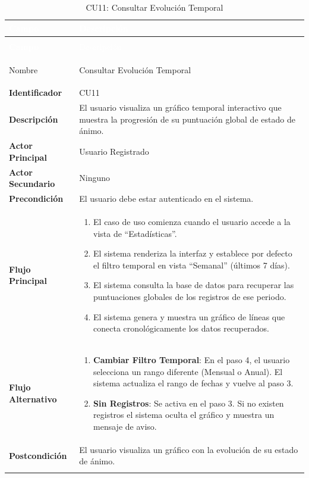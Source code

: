 \begingroup
\small 
\renewcommand{\arraystretch}{1.4}
\begin{xltabular}{\textwidth}{|>{\bfseries}p{3.5cm}|X|}
    \textcolor{white}{Campo} & \textcolor{white}{Descripción} \\ \hline
    \endfirsthead

     \\
    \hline
    \textcolor{white}{Campo} & \textcolor{white}{Descripción} \\ \hline
    \endhead

    Nombre & Consultar Evolución Temporal \\ \hline
    Identificador & CU11 \\ \hline
    Descripción & El usuario visualiza un gráfico temporal interactivo que muestra la progresión de su puntuación global de estado de ánimo. \\ \hline
    Actor Principal & Usuario Registrado \\ \hline
    Actor Secundario & Ninguno \\ \hline
    Precondición & El usuario debe estar autenticado en el sistema. \\ \hline
    Flujo Principal & 
    \begin{enumerate}[leftmargin=0.5cm, topsep=0pt, partopsep=0pt, parsep=0pt, itemsep=4pt]
        \item El caso de uso comienza cuando el usuario accede a la vista de ``Estadísticas''.
        \item El sistema renderiza la interfaz y establece por defecto el filtro temporal en vista ``Semanal'' (últimos 7 días).
        \item El sistema consulta la base de datos para recuperar las puntuaciones globales de los registros de ese periodo.
        \item El sistema genera y muestra un gráfico de líneas que conecta cronológicamente los datos recuperados.
    \end{enumerate} 
    \\ \hline
    Flujo Alternativo & 
    \begin{enumerate}[leftmargin=0.5cm, topsep=0pt, partopsep=0pt, parsep=0pt, itemsep=4pt]
        \item \textbf{Cambiar Filtro Temporal}: En el paso 4, el usuario selecciona un rango diferente (Mensual o Anual). El sistema actualiza el rango de fechas y vuelve al paso 3.
        \item \textbf{Sin Registros}: Se activa en el paso 3. Si no existen registros el sistema oculta el gráfico y muestra un mensaje de aviso.
    \end{enumerate}
    \\ \hline
    Postcondición & El usuario visualiza un gráfico con la evolución de su estado de ánimo. \\ \hline
    \caption{CU11: Consultar Evolución Temporal}
    \label{tab:esp_cu11} \\
\end{xltabular}
\endgroup


